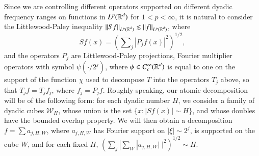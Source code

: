 Since we are controlling different operators supported on different dyadic frequency ranges on functions in $L^p(\operatorname{\mathbb{R}}^d)$ for $1 < p < \infty$, it is natural to consider the Littlewood-Paley inequality $\| Sf \|_{L^p(\operatorname{\mathbb{R}}^d)} \lesssim \| f \|_{L^p(\operatorname{\mathbb{R}}^d)}$, where
%
\[ Sf(x) = \left( \sum\nolimits_j |P_j f(x)|^2 \right)^{1/2}, \]
%
and the operators $P_j$ are Littlewood-Paley projections, Fourier multiplier operators with symbol $\psi(\cdot / 2^j)$, where $\psi \in C_c^\infty(\operatorname{\mathbb{R}}^d)$ is equal to one on the support of the function $\chi$ used to decompose $T$ into the operators $T_j$ above, so that $T_j f = T_j f_j$, where $f_j = P_j f$. Roughly speaking, our atomic decomposition will be of the following form: for each dyadic number $H$, we consider a family of dyadic cubes $\mathcal{W}_H$, whose union is the set $\{ x : |Sf(x)| \sim H \}$, and whose doubles have the bounded overlap property. We will then obtain a decomposition $f = \sum a_{j,H,W}$, where $a_{j,H,W}$ has Fourier support on $|\xi| \sim 2^j$, is supported on the cube $W$, and for each fixed $H$, $(\sum\nolimits_j |\sum\nolimits_W |a_{j,H,W}|\; |^2 )^{1/2} \sim H$.

